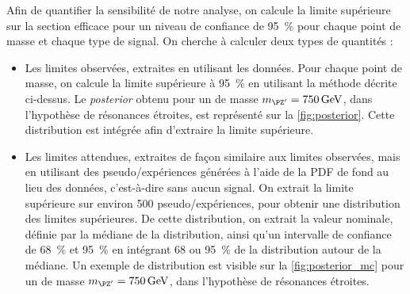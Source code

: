 Afin de quantifier la sensibilité de notre analyse, on calcule la limite supérieure sur la section efficace pour un niveau de confiance de \SI{95}{\percent} pour chaque point de masse et chaque type de signal.
On cherche à calculer deux types de quantités :
\begin{itemize}
  \item Les limites observées, extraites en utilisant les données. Pour chaque point de masse, on calcule la limite supérieure à \SI{95}{\percent} en utilisant la méthode décrite ci-dessus. Le \emph{posterior} obtenu pour un \zprime de masse $\mzp = \SI{750}{\GeV}$, dans l'hypothèse de résonances étroites, est représenté sur la \cref{fig:posterior}. Cette distribution est intégrée afin d'extraire la limite supérieure.
  \item Les limites attendues, extraites de façon similaire aux limites observées, mais en utilisant des pseudo\-/expériences générées à l'aide de la PDF de fond au lieu des données, c'est-à-dire sans aucun signal. On extrait la limite supérieure sur environ \num{500} pseudo\-/expériences, pour obtenir une distribution des limites supérieures. De cette distribution, on extrait la valeur nominale, définie par la médiane de la distribution, ainsi qu'un intervalle de confiance de \SI{68}{\percent} et \SI{95}{\%} en intégrant 68 ou \SI{95}{\percent} de la distribution autour de la médiane. Un exemple de distribution est visible sur la \cref{fig:posterior_mc} pour un \zprime de masse $\mzp = \SI{750}{\GeV}$, dans l'hypothèse de résonances étroites.
\end{itemize}

